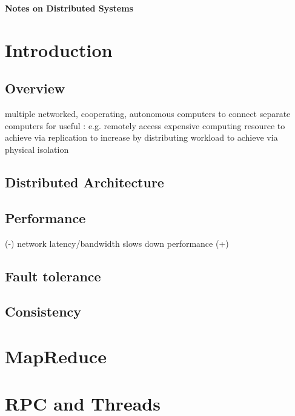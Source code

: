 \documentclass{note}
\begin{document}
\small

\begin{center}
{\large\bf \textcolor{blue2}{Notes on Distributed Systems}}
\end{center}

\vspace*{1cm}

\tableofcontents
\pagebreak

\section{Introduction}
\subsection{Overview}
\bit
\w {} multiple networked, cooperating,
autonomous computers
\w {}
  \bit
  \w to connect separate computers for useful :
  e.g. remotely access expensive computing resource
  \w to achieve  via replication
  \w to increase  by distributing workload
  \w to achieve  via physical isolation
  \eit
\eit

\subsection{Distributed Architecture}


\subsection{Performance}
\bit
\w (-) network latency/bandwidth slows down performance
\w (+) 
\eit

\subsection{Fault tolerance}

\subsection{Consistency}


\section{MapReduce}

\section{RPC and Threads}
\end{document}
